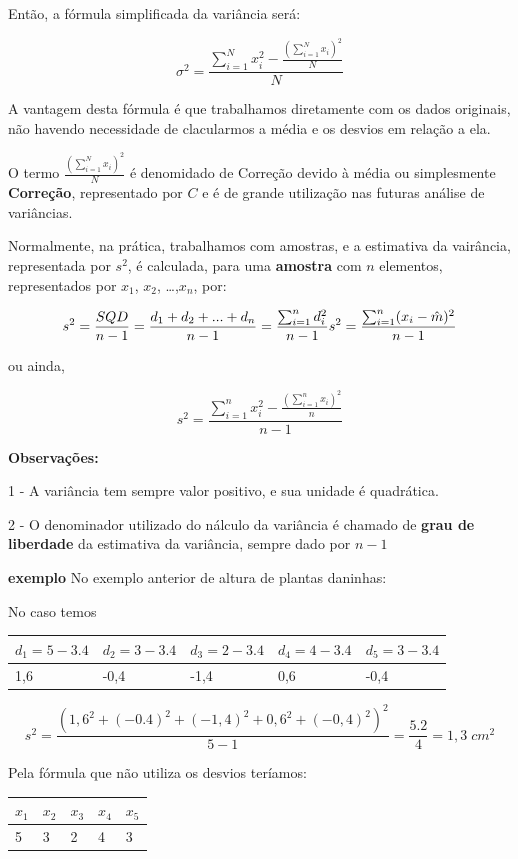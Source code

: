 \documentclass[
]{article}
\begin{document}
Então, a fórmula simplificada da variância será:

\[
\sigma^2 =\frac{\sum_{i=1}^Nx_i^2-\frac{(\sum_{i=1}^N x_i)^2}{N}}{N}
\]

A vantagem desta fórmula é que trabalhamos diretamente com os dados
originais, não havendo necessidade de clacularmos a média e os desvios
em relação a ela.

O termo \(\frac{(\sum_{i=1}^Nx_i)^2}{N}\) é denomidado de Correção
devido à média ou simplesmente \textbf{Correção}, representado por \(C\)
e é de grande utilização nas futuras análise de variâncias.

Normalmente, na prática, trabalhamos com amostras, e a estimativa da
vairância, representada por \(s^2\), é calculada, para uma
\textbf{amostra} com \(n\) elementos, representados por \(x_1\),
\(x_2\), \ldots,\(x_n\), por:

\[
s^2 = \frac{SQD}{n-1} = \frac{d_1+d_2+...+d_n}{n-1} =\frac{\sum_{i=1}^nd_i^2}{n-1} \\
s^2 =\frac{\sum_{i=1}^n(x_i-\hat{m})^2}{n-1}
\]

ou ainda,

\[
s^2 =\frac{\sum_{i=1}^nx_i^2-\frac{(\sum_{i=1}^n x_i)^2}{n}}{n-1}
\]

\textbf{Observações:}

1 - A variância tem sempre valor positivo, e sua unidade é quadrática.

2 - O denominador utilizado do nálculo da variância é chamado de
\textbf{grau de liberdade} da estimativa da variância, sempre dado por
\(n-1\)

\textbf{exemplo} No exemplo anterior de altura de plantas daninhas:

No caso temos

\begin{longtable}[]{@{}lllll@{}}
\toprule
\(d_1 = 5-3.4\) & \(d_2=3-3.4\) & \(d_3 = 2-3.4\) & \(d_4 = 4-3.4\) &
\(d_5 = 3-3.4\)\tabularnewline
\midrule
\endhead
1,6 & -0,4 & -1,4 & 0,6 & -0,4\tabularnewline
\bottomrule
\end{longtable}

\[
s^2 =\frac{(1,6^2+(-0.4)^2+(-1,4)^2+0,6^2+(-0,4)^2)^2}{5-1} = \frac{5.2}{4} = 1,3 \;cm^2
\]

Pela fórmula que não utiliza os desvios teríamos:

\begin{longtable}[]{@{}lllll@{}}
\toprule
\(x_1\) & \(x_2\) & \(x_3\) & \(x_4\) & \(x_5\)\tabularnewline
\midrule
\endhead
5 & 3 & 2 & 4 & 3\tabularnewline
\bottomrule
\end{longtable}
\end{document}
